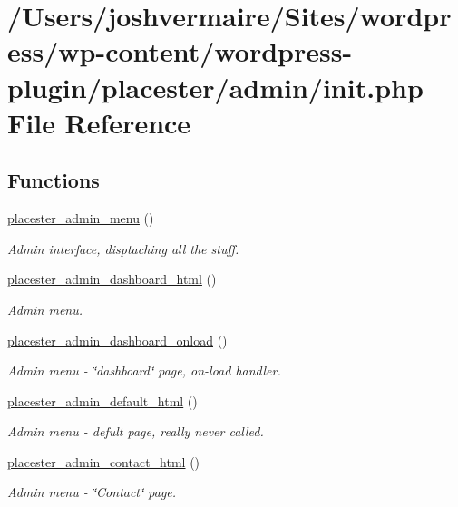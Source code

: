 \hypertarget{admin_2init_8php}{
\section{/Users/joshvermaire/Sites/wordpress/wp-\/content/wordpress-\/plugin/placester/admin/init.php File Reference}
\label{d7/dfd/admin_2init_8php}
}
\subsection*{Functions}
\begin{DoxyCompactItemize}
\item 
\hyperlink{admin_2init_8php_aa67f69f2027b8bfab341ca6bca940b9e}{placester\_\-admin\_\-menu} ()
\begin{DoxyCompactList}\small\item\em Admin interface, disptaching all the stuff. \end{DoxyCompactList}\item 
\hyperlink{admin_2init_8php_abffe6aa224b8e6759f26cf94618c0afd}{placester\_\-admin\_\-dashboard\_\-html} ()
\begin{DoxyCompactList}\small\item\em Admin menu. \end{DoxyCompactList}\item 
\hyperlink{admin_2init_8php_a7cd6a31747b8d5fcca73f41f21cdfd41}{placester\_\-admin\_\-dashboard\_\-onload} ()
\begin{DoxyCompactList}\small\item\em Admin menu -\/ \char`\"{}dashboard\char`\"{} page, on-\/load handler. \end{DoxyCompactList}\item 
\hyperlink{admin_2init_8php_aa4ff9b57871938d301a4375cbf034575}{placester\_\-admin\_\-default\_\-html} ()
\begin{DoxyCompactList}\small\item\em Admin menu -\/ defult page, really never called. \end{DoxyCompactList}\item 
\hyperlink{admin_2init_8php_a8f75b541ebaa19162e2c6c320635f6ab}{placester\_\-admin\_\-contact\_\-html} ()
\begin{DoxyCompactList}\small\item\em Admin menu -\/ \char`\"{}Contact\char`\"{} page. \end{DoxyCompactList}\item 

\end{DoxyCompactItemize}
